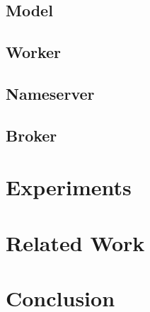 \documentclass[conference]{IEEEtran}
\begin{document}
\subsection{Model}

\subsection{Worker}

\subsection{Nameserver}

\subsection{Broker}

\section{Experiments}

\section{Related Work}

\section{Conclusion}



\end{document}
